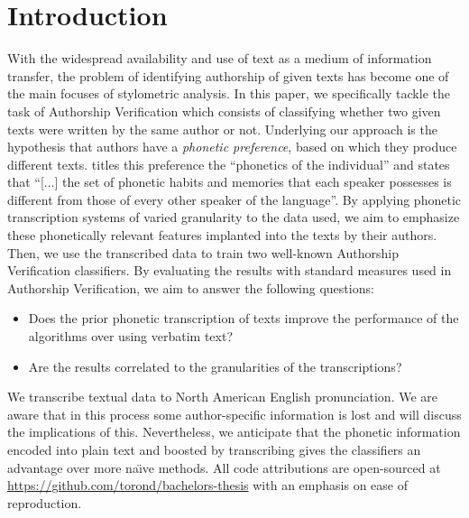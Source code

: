 \chapter{Introduction}\label{introduction}
With the widespread availability and use of text as a medium of information transfer, the problem of identifying authorship of given texts has become one of the main focuses of stylometric analysis.
In this paper, we specifically tackle the task of Authorship Verification which consists of classifying whether two given texts were written by the same author or not.
Underlying our approach is the hypothesis that authors have a \textit{phonetic preference}, based on which they produce different texts.
\cite{ladefoged2014courseInPhonetics} titles this preference the ``phonetics of the individual'' and states that ``[...] the set of phonetic habits and memories that each speaker possesses is different from those of every other speaker of the language''.
By applying phonetic transcription systems of varied granularity to the data used, we aim to emphasize these phonetically relevant features implanted into the texts by their authors.
Then, we use the transcribed data to train two well-known Authorship Verification classifiers.
By evaluating the results with standard measures used in Authorship Verification, we aim to answer the following questions:
\begin{itemize}
  \item Does the prior phonetic transcription of texts improve the performance of the algorithms over using verbatim text?
  \item Are the results correlated to the granularities of the transcriptions?
\end{itemize}
We transcribe textual data to North American English pronunciation.
We are aware that in this process some author-specific information is lost and will discuss the implications of this.
Nevertheless, we anticipate that the phonetic information encoded into plain text and boosted by transcribing gives the classifiers an advantage over more na\"{\i}ve methods.
All code attributions are open-sourced at \url{https://github.com/torond/bachelors-thesis} with an emphasis on ease of reproduction.


